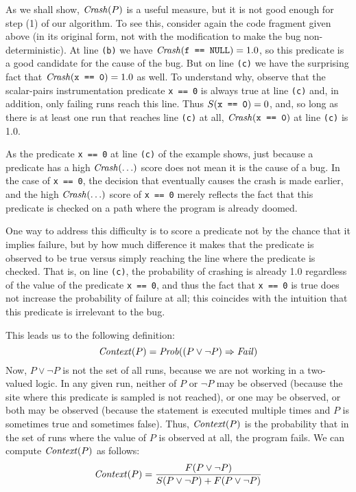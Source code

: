 As we shall show, $\mbox{\textit{Crash}}(P)$ is a useful measure, but it is not good
enough for step (1) of our algorithm. To see this, consider again the
code fragment given above (in its original form, not with the
modification to make the bug non-deterministic).  At line {\tt (b)} we
have $\mbox{\textit{Crash}}(\mbox{\tt f == NULL}) = 1.0$, so this predicate is a good
candidate for the cause of the bug.
But on line {\tt (c)} we have the surprising fact that $\mbox{\textit{Crash}}(\mbox{\tt x == 0}) = 1.0$ as well.
To understand why, observe that the scalar-pairs instrumentation
predicate \texttt{x == 0} is always true at line {\tt (c)} and, in
addition,
only failing runs reach this line.
Thus $S(\mbox{\tt x == 0}) = 0$, and, so long as there is at least one run that
reaches line {\tt (c)} at all, $\mbox{\textit{Crash}}(\mbox{\tt x == 0})$ at line {\tt (c)} is 1.0.

As the predicate {\tt x == 0} at line {\tt (c)} of the example
shows, just because a predicate has a high $\mbox{\textit{Crash}}(\ldots)$ score does not
mean it is the cause of a bug.  In the case of {\tt x == 0}, the
decision that eventually causes the crash is made earlier, and the
high $\mbox{\textit{Crash}}(\ldots)$ score of {\tt x == 0} merely reflects the fact that this
predicate is checked on a path where the program is already doomed.

One way to address this difficulty is to score a predicate not by the chance
that it implies failure, but by how much difference it makes that the predicate
is observed to be true versus simply reaching the line where the predicate is checked.
That is, on line {\tt (c)}, the probability of crashing is already 1.0 regardless
of the value of the predicate {\tt x == 0}, and thus the fact that {\tt x == 0} is
true does not increase the probability of failure at all; this coincides with
the intuition that this predicate is irrelevant to the bug.

This leads us to the following definition:
\[ \mbox{\textit{Context}}(P) = \mbox{\textit{Prob}}((P \lor \lnot P) \Rightarrow \mbox{\textit{Fail}}) \]
Now, $P \lor \lnot P$ is not the set of all runs, because we are not working in a two-valued logic.
In any given run, neither of $P$ or $\lnot P$ may be observed (because the site where this predicate is
sampled is not reached), or one may be observed, or both may be observed (because the statement is executed
multiple times and $P$ is sometimes true and sometimes false).  Thus, $\mbox{\textit{Context}}(P)$ is the probability that
in the set of runs where the value of $P$ is observed at all, the program fails. We can compute $\mbox{\textit{Context}}(P)$ as follows:
\[ \mbox{\textit{Context}}(P) = \frac{F(P \lor \lnot P)}{S(P \lor \lnot P) + F(P \lor \lnot P)} \]

